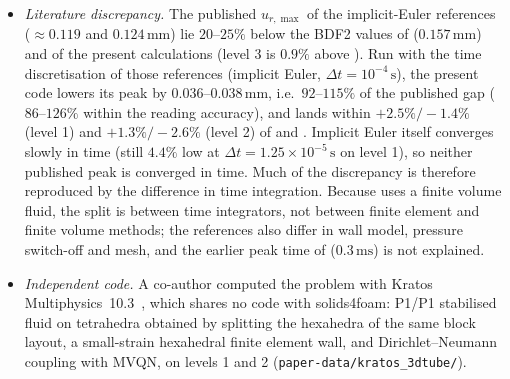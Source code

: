 \begin{itemize}
	On the earlier version of the meshes, after both corrections, the two platforms agree on levels 1 and 2 to all reported digits in the displacements and arrival time ($u_{z,\min}$ to better than $0.01\%$, two orders of magnitude below the level-2-to-3 change) and to $0.02\%$ in $c_p$ ($4.635$ and $4.634\,\mathrm{m/s}$ on level 2). The level-3 replicate (OpenFOAM-v2512, GCC 11.4 \texttt{-O3}, 24 ranks, against OpenFOAM-v2412, \texttt{-O2}, 128 ranks) reproduces $u_{r,\max}$, $u_{z,\min}$ and $t_\mathrm{arr}$ to all reported digits and $c_p$ to $0.09\%$ ($4.598$ against $4.594\,\mathrm{m/s}$), an order of magnitude below the level-2-to-3 change, and a third replicate on a desktop workstation (OpenFOAM-v2512, GCC 13.3 \texttt{-O3}, 32 ranks) does the same with $c_p = 4.597\,\mathrm{m/s}$; the growing change in $u_{r,\max}$ is therefore a property of the discretisation, not of the platform.
	\item \emph{Literature discrepancy.} The published $u_{r,\max}$ of the implicit-Euler references ($\approx0.119$ and $0.124\,\mathrm{mm}$) lie $20$--$25\%$ below the BDF2 values of \citet{Tukovic2018} ($0.157\,\mathrm{mm}$) and of the present calculations (level 3 is $0.9\%$ above \citet{Tukovic2018}). Run with the time discretisation of those references (implicit Euler, $\Delta t = 10^{-4}\,\mathrm{s}$), the present code lowers its peak by $0.036$--$0.038\,\mathrm{mm}$, i.e.\ $92$--$115\%$ of the published gap ($86$--$126\%$ within the reading accuracy), and lands within $+2.5\%/-1.4\%$ (level 1) and $+1.3\%/-2.6\%$ (level 2) of \citet{Lozovskiy2019} and \citet{Eken2016}. Implicit Euler itself converges slowly in time (still $4.4\%$ low at $\Delta t = 1.25\times10^{-5}\,\mathrm{s}$ on level 1), so neither published peak is converged in time. Much of the discrepancy is therefore reproduced by the difference in time integration. Because \citet{Eken2016} uses a finite volume fluid, the split is between time integrators, not between finite element and finite volume methods; the references also differ in wall model, pressure switch-off and mesh, and the earlier peak time of \citet{Eken2016} ($0.3\,\mathrm{ms}$) is not explained.
	\item \emph{Independent code.} A co-author computed the problem with Kratos Multiphysics~10.3~\citep{Dadvand2010}, which shares no code with solids4foam: P1/P1 stabilised fluid on tetrahedra obtained by splitting the hexahedra of the same block layout, a small-strain hexahedral finite element wall, and Dirichlet--Neumann coupling with MVQN, on levels 1 and 2 (\texttt{paper-data/kratos\_3dtube/}).

\end{itemize}

